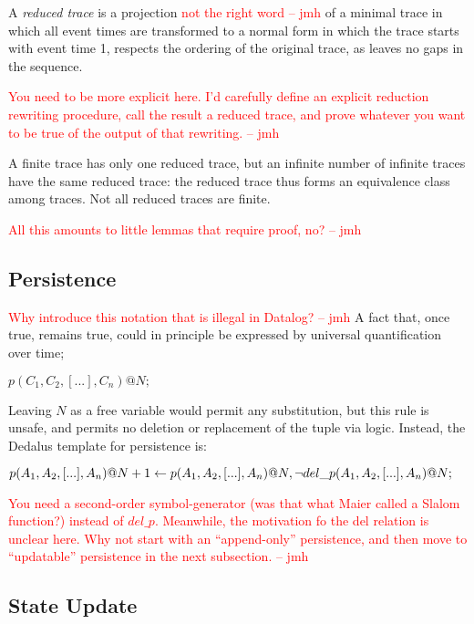 \documentclass{acm_proc_article-sp-sigmod09}
\newcommand{\jmh}[1]{{\textcolor{red}{#1 -- jmh}}}
\newenvironment{Dedalus}{
\vspace{0.5em}\begin{minipage}{0.95\textwidth}%
\begin{alltt}\fontsize{9pt}{9pt}\selectfont}
{\end{alltt}\end{minipage}\vspace{0.5em}}
\begin{document}
\begin{definition}
A \emph{reduced trace} is a projection \jmh{not the right word} of a minimal trace in which all event times are transformed
to a normal form in which the trace starts with event time 1, respects the ordering of the original trace, as leaves no gaps in the sequence.
\end{definition}

\jmh{You need to be more explicit here.  I'd carefully define an explicit reduction rewriting procedure, call the result a reduced trace, and prove whatever you want to be true of the output of that rewriting.}

A finite trace has only one reduced trace, but an infinite number of infinite traces have the same reduced trace: the reduced trace thus forms an 
equivalence class among traces.  Not all reduced traces are finite.

\jmh{All this amounts to little lemmas that require proof, no?}

\subsection{Persistence}
\jmh{Why introduce this notation that is illegal in Datalog?}
A fact that, once true, remains true, could in principle be expressed by universal quantification over time;

$p(C_1,C_{2},[...],C_{n})@N;$

Leaving $N$ as a free variable would permit any substitution, but this rule is unsafe, and permits no deletion or replacement 
of the tuple via logic.  Instead, the Dedalus template for persistence is:

$p(A_{1}, A_{2}, [...], A_{n})@N+1 \leftarrow \\
  p(A_{1}, A_{2}, [...], A_{n})@N, \\
  \lnot del\_p(A_{1}, A_{2}, [...], A_{n})@N;
  $

\jmh{You need a second-order symbol-generator (was that what Maier called a Slalom function?) instead of $del\_p$.  Meanwhile, the motivation fo the del relation is unclear here.  Why not start with an ``append-only'' persistence, and then move to ``updatable'' persistence in the next subsection.}

\subsection{State Update}
\end{document}
